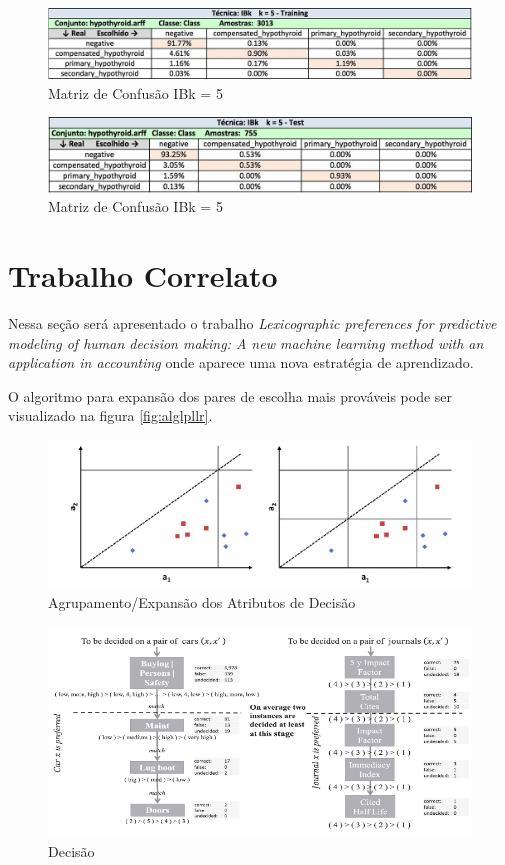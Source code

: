 \documentclass[12pt]{article}
\begin{document}
\begin{figure}[!h]
\centering
\includegraphics[width=.88\textwidth]{ibk5-train.png}
\caption{Matriz de Confusão IBk = 5}
\label{fig:trainibk5}
\end{figure}

\begin{figure}[!h]
\centering
\includegraphics[width=.88\textwidth]{ibk5-test.png}
\caption{Matriz de Confusão IBk = 5}
\label{fig:testibk5}
\end{figure}

%

\section{Trabalho Correlato} \label{sec:correlato}

Nessa seção será apresentado o trabalho \textit{Lexicographic preferences for predictive modeling of human decision making: A new machine learning method with an application in accounting}\cite{lexic} onde aparece uma nova estratégia de aprendizado.

O algoritmo para expansão dos pares de escolha mais prováveis pode ser visualizado na figura \ref{fig:alglpllr}.
\begin{figure}[h]
	\centering
	\includegraphics[width=.68\textwidth]{agrupamennto.png}
	\caption{Agrupamento/Expansão dos Atributos de Decisão}
	\label{fig:agrupamento}
\end{figure}

\begin{figure}[h]
	\centering
	\includegraphics[width=.88\textwidth]{decisao.png}
	\caption{Decisão}
	\label{fig:decisao}
\end{figure}
\end{document}
